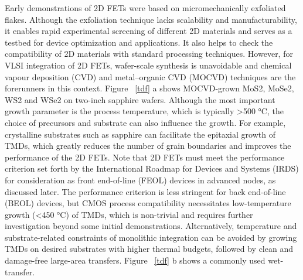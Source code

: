 \documentclass[12pt,a4paper]{report}
\begin{document}
  Early demonstrations of 2D FETs were based on micromechanically exfoliated flakes. Although the exfoliation technique lacks scalability and manufacturability, it enables rapid experimental screening of different 2D materials and serves as a testbed for device optimization and applications. It also helps to check the compatibility of 2D materials with standard processing techniques. However, for VLSI integration of 2D FETs, wafer-scale synthesis is unavoidable and chemical vapour deposition (CVD) and metal–organic CVD (MOCVD) techniques are the forerunners in this context. Figure ~\ref{tdf} a shows MOCVD-grown MoS2, MoSe2, WS2 and WSe2 on two-inch sapphire wafers. Although the most important growth parameter is the process temperature, which is typically >500 °C, the choice of precursors and substrate can also influence the growth. For example, crystalline substrates such as sapphire can facilitate the epitaxial growth of TMDs, which greatly reduces the number of grain boundaries and improves the performance of the 2D FETs. Note that 2D FETs must meet the performance criterion set forth by the International Roadmap for Devices and Systems (IRDS) for consideration as front end-of-line (FEOL) devices in advanced nodes, as discussed later. The performance criterion is less stringent for back end-of-line (BEOL) devices, but CMOS process compatibility necessitates low-temperature growth (<450 °C) of TMDs, which is non-trivial and requires further investigation beyond some initial demonstrations. Alternatively, temperature and substrate-related constraints of monolithic integration can be avoided by growing TMDs on desired substrates with higher thermal budgets, followed by clean and damage-free large-area transfers. Figure ~\ref{tdf} b shows a commonly used wet-transfer.
\end{document}
